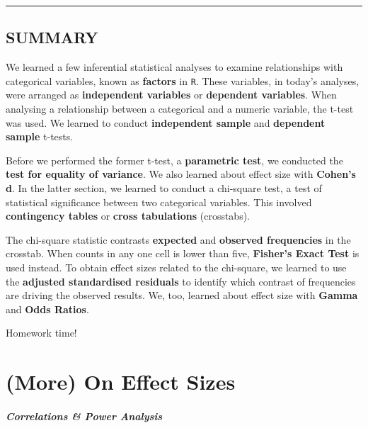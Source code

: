 \documentclass[
]{book}
\begin{document}
\begin{center}\rule{0.5\linewidth}{0.5pt}\end{center}

\hypertarget{summary-6}{%
\section{SUMMARY}\label{summary-6}}

We learned a few inferential statistical analyses to examine relationships with categorical variables, known as \textbf{factors} in \texttt{R}. These variables, in today's analyses, were arranged as \textbf{independent variables} or \textbf{dependent variables}. When analysing a relationship between a categorical and a numeric variable, the t-test was used. We learned to conduct \textbf{independent sample} and \textbf{dependent sample} t-tests.

Before we performed the former t-test, a \textbf{parametric test}, we conducted the \textbf{test for equality of variance}. We also learned about effect size with \textbf{Cohen's d}. In the latter section, we learned to conduct a chi-square test, a test of statistical significance between two categorical variables. This involved \textbf{contingency tables} or \textbf{cross tabulations} (crosstabs).

The chi-square statistic contrasts \textbf{expected} and \textbf{observed frequencies} in the crosstab. When counts in any one cell is lower than five, \textbf{Fisher's Exact Test} is used instead. To obtain effect sizes related to the chi-square, we learned to use the \textbf{adjusted standardised residuals} to identify which contrast of frequencies are driving the observed results. We, too, learned about effect size with \textbf{Gamma} and \textbf{Odds Ratios}.

Homework time!

\hypertarget{more-on-effect-sizes}{%
\chapter{(More) On Effect Sizes}\label{more-on-effect-sizes}}

\hypertarget{correlations-power-analysis}{%
\subsubsection*{\texorpdfstring{\emph{Correlations \& Power Analysis}}{Correlations \& Power Analysis}}\label{correlations-power-analysis}}
\end{document}
